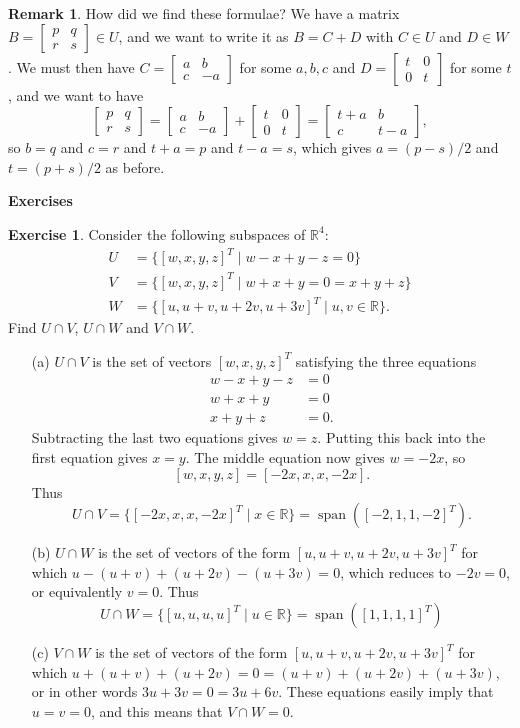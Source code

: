 \documentclass{amsart}
\newcommand{\R}         {{\mathbb{R}}}
\newcommand{\spn}       {\operatorname{span}}
\newcommand{\bsm}       {\left[\begin{smallmatrix}}
\newcommand{\esm}       {\end{smallmatrix}\right]}
\newcommand{\st}        {\;|\;}
\renewcommand{\:}       {\colon}
\theoremstyle{definition}
\newtheorem{remark}[theorem]{Remark}
\newtheorem{exercise}{Exercise}[section]
\renewenvironment{solution}{\SolutionAtEnd}{\endSolutionAtEnd}
\begin{document}
\begin{remark}
 How did we find these formulae?  We have a matrix $B=\bsm
 p&q\\r&s\esm\in U$, and we want to write it as $B=C+D$ with $C\in U$
 and $D\in W$.  We must then have $C=\bsm a&b\\c&-a\esm$ for some
 $a,b,c$ and $D=\bsm t&0\\0&t\esm$ for some $t$, and we want to have
 \[ \bsm p & q \\ r & s\esm =
     \bsm a&b\\c&-a\esm + \bsm t & 0 \\ 0 & t\esm = 
       \bsm t+a & b \\ c & t-a \esm,
 \]
 so $b=q$ and $c=r$ and $t+a=p$ and $t-a=s$, which gives $a=(p-s)/2$
 and $t=(p+s)/2$ as before.
\end{remark}


\begin{center}
 \Large \textbf{Exercises}
\end{center}

\begin{exercise}
 Consider the following subspaces of $\R^4$:
 \begin{align*}
  U &= \{ [w,x,y,z]^T \st w-x+y-z=0 \} \\
  V &= \{ [w,x,y,z]^T \st w+x+y=0=x+y+z \} \\
  W &= \{ [u,u+v,u+2v,u+3v]^T \st u,v\in\R\}.
 \end{align*}
 Find $U\cap V$, $U\cap W$ and $V\cap W$.
\end{exercise}
\begin{solution}
 \begin{itemize}
  \item[(a)] $U\cap V$ is the set of vectors $[w,x,y,z]^T$
   satisfying the three equations
   \begin{align*}
    w-x+y-z &= 0 \\
    w+x+y &= 0 \\
    x+y+z &= 0.
   \end{align*}
   Subtracting the last two equations gives $w=z$.  Putting
   this back into the first equation gives $x=y$.  The
   middle equation now gives $w=-2x$, so 
   \[ [w,x,y,z] = [-2x,x,x,-2x]. \]
   Thus 
   \[ U\cap V = \{ [-2x,x,x,-2x]^T \st x\in\R\} = 
       \spn([-2,1,1,-2]^T).
   \]
  \item[(b)] $U\cap W$ is the set of vectors of the form
   $[u,u+v,u+2v,u+3v]^T$ for which
   $u-(u+v)+(u+2v)-(u+3v)=0$, which reduces to $-2v=0$, or
   equivalently $v=0$.  Thus 
   \[ U\cap W = \{[u,u,u,u]^T\st u\in\R\} = 
       \spn([1,1,1,1]^T) 
   \]
  \item[(c)] $V\cap W$ is the set of vectors of the form 
   $[u,u+v,u+2v,u+3v]^T$ for which
   $u+(u+v)+(u+2v)=0=(u+v)+(u+2v)+(u+3v)$, or in other words
   $3u+3v=0=3u+6v$.  These equations easily imply that
   $u=v=0$, and this means that $V\cap W=0$.
 \end{itemize}
\end{solution}
\end{document}
